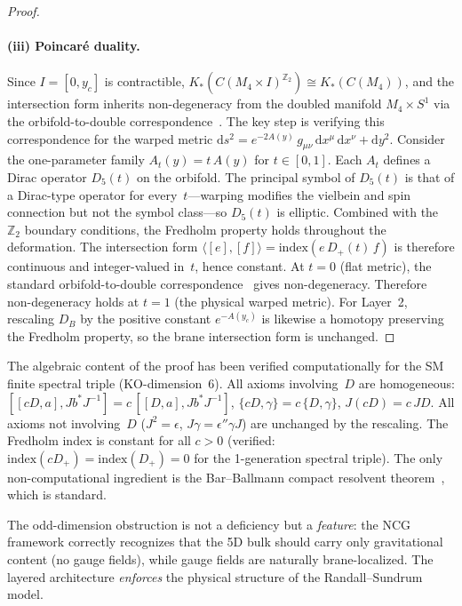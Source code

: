 \begin{proof}
\paragraph{(iii) Poincar\'e duality.}
Since $I = [0, y_c]$ is contractible, $K_*(C(M_4 \times I)^{\mathbb{Z}_2}) \cong K_*(C(M_4))$, and the intersection form inherits non-degeneracy from the doubled manifold $M_4 \times S^1$ via the orbifold-to-double correspondence~\cite{ch4:bruning2001,ch4:bar2012}. The key step is verifying this correspondence for the warped metric $\mathrm{d}s^2 = e^{-2A(y)}\,g_{\mu\nu}\,\mathrm{d}x^\mu\,\mathrm{d}x^\nu + \mathrm{d}y^2$. Consider the one-parameter family $A_t(y) = t\,A(y)$ for $t \in [0,1]$. Each $A_t$ defines a Dirac operator $D_5(t)$ on the orbifold. The principal symbol of $D_5(t)$ is that of a Dirac-type operator for every~$t$---warping modifies the vielbein and spin connection but not the symbol class---so $D_5(t)$ is elliptic. Combined with the $\mathbb{Z}_2$ boundary conditions, the Fredholm property holds throughout the deformation. The intersection form $\langle [e], [f] \rangle = \mathrm{index}(e\,D_+(t)\,f)$ is therefore continuous and integer-valued in~$t$, hence constant. At $t = 0$ (flat metric), the standard orbifold-to-double correspondence~\cite{ch4:bruning2001} gives non-degeneracy. Therefore non-degeneracy holds at $t = 1$ (the physical warped metric). For Layer~2, rescaling $D_B$ by the positive constant $e^{-A(y_c)}$ is likewise a homotopy preserving the Fredholm property, so the brane intersection form is unchanged.
\end{proof}

\begin{remark}
\label{rem:4-conj-verification}
The algebraic content of the proof has been verified computationally for the SM finite spectral triple (KO-dimension~6). All axioms involving~$D$ are homogeneous: $[[cD, a], Jb^*J^{-1}] = c\,[[D, a], Jb^*J^{-1}]$, $\{cD, \gamma\} = c\,\{D, \gamma\}$, $J(cD) = c\,JD$. All axioms not involving~$D$ ($J^2 = \epsilon$, $J\gamma = \epsilon''\gamma J$) are unchanged by the rescaling. The Fredholm index is constant for all $c > 0$ (verified: $\mathrm{index}(cD_+) = \mathrm{index}(D_+) = 0$ for the 1-generation spectral triple). The only non-computational ingredient is the Bar--Ballmann compact resolvent theorem~\cite{ch4:bar2012}, which is standard.
\end{remark}

\begin{remark}
The odd-dimension obstruction is not a deficiency but a \emph{feature}: the NCG framework correctly recognizes that the 5D bulk should carry only gravitational content (no gauge fields), while gauge fields are naturally brane-localized. The layered architecture \emph{enforces} the physical structure of the Randall--Sundrum model.
\end{remark}



